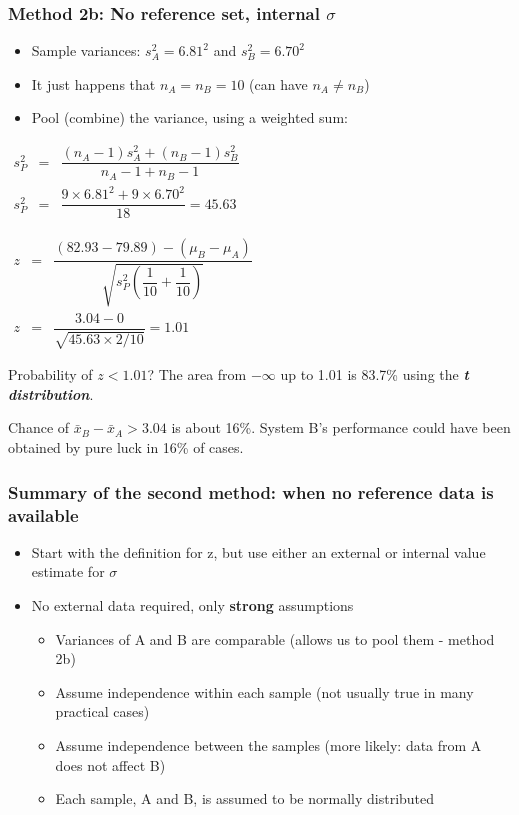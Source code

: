 \begin{frame}\frametitle{Method 2b: No reference set, internal $\sigma$}
	\begin{itemize}
		\item	Sample variances: $s_A^2 = 6.81^2$ and $s_B^2 = 6.70^2$
		\item	It just happens that $n_A = n_B = 10$ (can have $n_A \neq n_B$)
		\item	Pool (combine) the variance, using a weighted sum:
	\end{itemize}

	$
	\begin{array}{rcccl}
		s_P^2 &=& \dfrac{(n_A -1) s_A^2 + (n_B-1)s_B^2}{n_A - 1 + n_B - 1} \\
		s_P^2 &=& \dfrac{9\times 6.81^2 + 9 \times 6.70^2}{18} = 45.63
	\end{array}
	$

	\vspace{8pt}
	$
	\begin{array}{rcccl}
		z &=& \dfrac{(82.93 - 79.89) - (\mu_B - \mu_A)}{\sqrt{s_P^2 \left(\dfrac{1}{10} + \dfrac{1}{10}\right)}} \\
		z &=& \dfrac{3.04 - 0}{\sqrt{45.63 \times 2/10}} = 1.01
	\end{array}
	$

	\vspace{8pt}
	Probability of $z < 1.01$? The area from $-\infty$ up to 1.01 is 83.7\% using the \textbf{\emph{t distribution}}.

	Chance of $\bar{x}_B - \bar{x}_A > 3.04$ is about 16\%. System B's performance could have been obtained by pure luck in 16\% of cases.
\end{frame}

\begin{frame}\frametitle{Summary of the second method: when no reference data is available}
	\begin{itemize}
		\item	Start with the definition for z, but use either an external or internal value estimate for $\sigma$
		\item	No external data required, only \textbf{strong} assumptions
		\begin{itemize}
			\item	Variances of A and B are comparable (allows us to pool them - method 2b)
			\item	Assume independence within each sample (not usually true in many practical cases)
			\item	Assume independence between the samples (more likely: data from A does not affect B)
			\item	Each sample, A and B, is assumed to be normally distributed
		\end{itemize}
	\end{itemize}
\end{frame}

